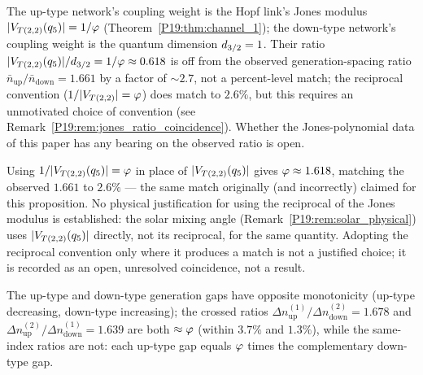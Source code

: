 \begin{proposition}
\label{P19:prop:jones_modulus_ratio}
The up-type network's coupling weight is the Hopf link's Jones
modulus $|V_{T(2,2)}(q_5)|=1/\varphi$
(Theorem~\ref{P19:thm:channel_1}); the down-type network's coupling
weight is the quantum dimension $d_{3/2}=1$. Their ratio
$|V_{T(2,2)}(q_5)|/d_{3/2}=1/\varphi\approx0.618$ is off from the
observed generation-spacing ratio $\bar n_{\mathrm{up}}/\bar
n_{\mathrm{down}}=1.661$ by a factor of $\sim2.7$, not a
percent-level match; the reciprocal convention ($1/|V_{T(2,2)}|
=\varphi$) does match to $2.6\%$, but this requires an unmotivated
choice of convention (see Remark~\ref{P19:rem:jones_ratio_coincidence}).
Whether the Jones-polynomial data of this paper has any bearing on
the observed ratio is open.
\end{proposition}

\begin{remark}
\label{P19:rem:jones_ratio_coincidence}
Using $1/|V_{T(2,2)}(q_5)|=\varphi$ in place of
$|V_{T(2,2)}(q_5)|$ gives $\varphi\approx1.618$, matching the
observed $1.661$ to $2.6\%$ --- the same match originally (and
incorrectly) claimed for this proposition. No physical justification
for using the reciprocal of the Jones modulus is established: the
solar mixing angle (Remark~\ref{P19:rem:solar_physical}) uses
$|V_{T(2,2)}(q_5)|$ directly, not its reciprocal, for the same
quantity. Adopting the reciprocal convention only where it produces a
match is not a justified choice; it is recorded as an open,
unresolved coincidence, not a result.
\end{remark}

\begin{remark}
\label{P19:rem:cross_ratio}
The up-type and down-type generation gaps have opposite monotonicity
(up-type decreasing, down-type increasing); the crossed ratios
$\Delta n_{\mathrm{up}}^{(1)}/\Delta n_{\mathrm{down}}^{(2)}=1.678$ and
$\Delta n_{\mathrm{up}}^{(2)}/\Delta n_{\mathrm{down}}^{(1)}=1.639$
are both $\approx\varphi$ (within $3.7\%$ and $1.3\%$), while the
same-index ratios are not: each up-type gap equals $\varphi$ times the
complementary down-type gap.
\end{remark}

